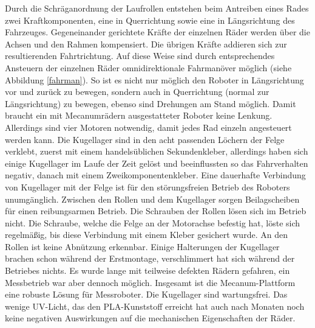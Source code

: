 \documentclass[a4paper,bibtotoc,oneside]{scrbook}
\begin{document}
Durch die Schräganordnung der Laufrollen entstehen beim Antreiben eines Rades zwei Kraftkomponenten, eine in Querrichtung sowie eine in Längsrichtung des Fahrzeuges. Gegeneinander gerichtete Kräfte der einzelnen Räder werden über die Achsen und den Rahmen kompensiert. Die übrigen Kräfte addieren sich zur resultierenden Fahrtrichtung. Auf diese Weise sind durch entsprechendes Ansteuern der einzelnen Räder omnidirektionale Fahrmanöver möglich (siehe Abbildung \ref{fahrman}). So ist es nicht nur möglich den Roboter in Längsrichtung vor und zurück zu bewegen, sondern auch in Querrichtung (normal zur Längsrichtung) zu bewegen, ebenso sind Drehungen am Stand möglich. Damit braucht ein mit Mecanumrädern ausgestatteter Roboter keine Lenkung. Allerdings sind vier Motoren notwendig, damit jedes Rad einzeln angesteuert werden kann.   
Die Kugellager sind in den acht passenden Löchern der Felge verklebt, zuerst mit einem handelsüblichen Sekundenkleber, allerdings haben sich einige Kugellager im Laufe der Zeit gelöst und beeinflussten so das Fahrverhalten negativ, danach mit einem Zweikomponentenkleber. Eine dauerhafte Verbindung von Kugellager mit der Felge ist für den störungsfreien Betrieb des Roboters unumgänglich. 
Zwischen den Rollen und dem Kugellager sorgen Beilagscheiben für einen reibungsarmen Betrieb. 
Die Schrauben der Rollen lösen sich im Betrieb nicht. Die Schraube, welche die Felge an der Motorachse befestig hat, löste sich regelmäßig, bis diese Verbindung mit einem Kleber gesichert wurde.
An den Rollen ist keine Abnützung erkennbar. Einige Halterungen der Kugellager brachen schon während der Erstmontage, verschlimmert hat sich während der Betriebes nichts.
Es wurde lange mit teilweise defekten Rädern gefahren, ein Messbetrieb war aber dennoch möglich. Insgesamt ist die Mecanum-Plattform eine robuste Lösung für Messroboter.
Die Kugellager sind wartungsfrei. Das wenige UV-Licht, das den PLA-Kunststoff erreicht hat auch nach Monaten noch keine negativen Auswirkungen auf die mechanischen Eigenschaften der Räder.
\end{document}
